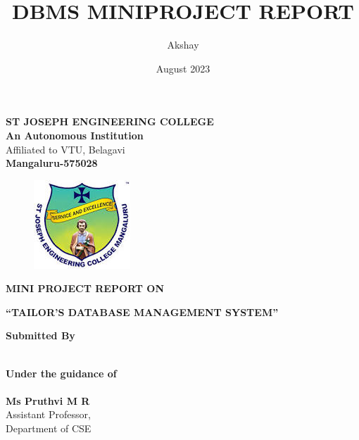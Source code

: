 \documentclass[12pt, letter paper]{report}
\title{DBMS MINIPROJECT REPORT }
\author{Akshay}
\date{August 2023}
\begin{document}
\thispagestyle{empty}
\begin{center}
\Large\textbf{ ST JOSEPH ENGINEERING COLLEGE\\ }
\textbf{An Autonomous Institution}\\
Affiliated to VTU, Belagavi\\
\textbf{Mangaluru-575028}
\end{center}

\begin{figure}[h]
 \centering
 \includegraphics[scale=1.1]{sjec.jpeg}
 \label{sjeclogo}
\end{figure}

\begin{center}
   \textbf{ MINI PROJECT REPORT ON }
\end{center}
\begin{center}
   \Large\textbf{“TAILOR'S DATABASE MANAGEMENT SYSTEM”}
\end{center}



 
\begin{center}
   \Large \textbf{Submitted By \\}
\end{center}

\begin{center}
\end{center}
   \begin{center}
\large \textbf{\\Under the guidance of \\}
\large  \textbf{ \\Ms Pruthvi  M R\\ }
\large  Assistant Professor,\\ Department of CSE
\end{center}
\end{document}
